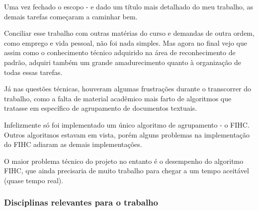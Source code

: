 \documentclass[a4paper,12pt]{article}
\begin{document}

Uma vez fechado o escopo - e dado um título mais detalhado do meu trabalho, as demais tarefas começaram a caminhar bem. 

Conciliar esse trabalho com outras matérias do curso e demandas de outra ordem, como emprego e vida pessoal, não foi nada simples. Mas agora no final vejo que assim como o conhecimento técnico adquirido na área de reconhecimento de padrão, adquiri também um grande amadurecimento quanto à organização de todas essas tarefas.

Já nas questões técnicas, houveram algumas frustrações durante o transcorrer do trabalho, como a falta de material acadêmico mais farto de algoritmos que tratasse em específico de agrupamento de documentos textuais.

Infelizmente só foi implementado um único algoritmo de agrupamento - o FIHC. Outros algoritmos estavam em vista, porém alguns problemas na implementação do FIHC adiaram as demais implementações.

O maior problema técnico do projeto no entanto é o desempenho do algoritmo FIHC, que ainda precisaria de muito trabalho para chegar a um tempo aceitável (quase tempo real).

\subsubsection {Disciplinas relevantes para o trabalho}
\label {sec:disciplinas relevantes para o trabalho}
\end{document}
